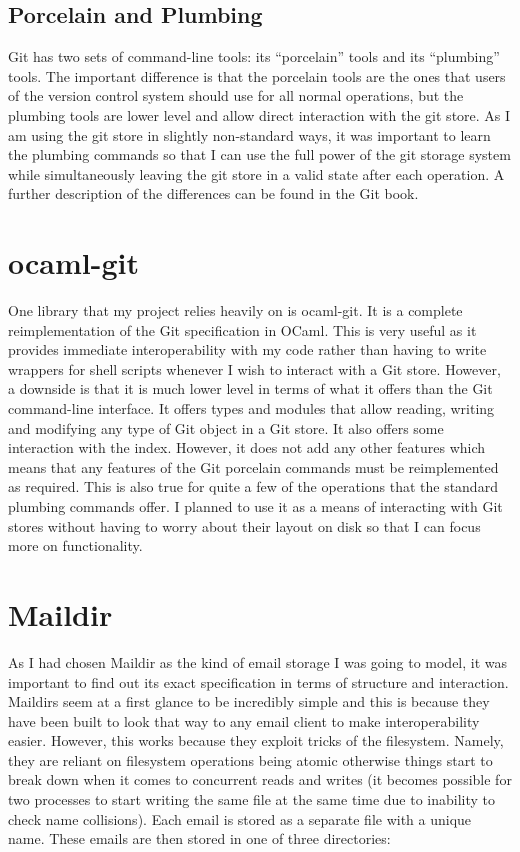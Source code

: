 \subsection{Porcelain and Plumbing}

Git has two sets of command-line tools: its ``porcelain'' tools and its ``plumbing'' tools. The important difference is that the porcelain tools are the ones that users of the version control system should use for all normal operations, but the plumbing tools are lower level and allow direct interaction with the git store. As I am using the git store in slightly non-standard ways, it was important to learn the plumbing commands so that I can use the full power of the git storage system while simultaneously leaving the git store in a valid state after each operation. A further description of the differences can be found in the Git book\cite{chacon2014git}.

\section{ocaml-git}

One library that my project relies heavily on is ocaml-git\cite{code_ocaml-git}. It is a complete reimplementation of the Git specification in OCaml. This is very useful as it provides immediate interoperability with my code rather than having to write wrappers for shell scripts whenever I wish to interact with a Git store. However,  a downside is that it is much lower level in terms of what it offers than the Git command-line interface. It offers types and modules that allow reading, writing and modifying any type of Git object in a Git store. It also offers some interaction with the index. However, it does not add any other features which means that any features of the Git porcelain commands must be reimplemented as required. This is also true for quite a few of the operations that the standard plumbing commands offer. I planned to use it as a means of interacting with Git stores without having to worry about their layout on disk so that I can focus more on functionality.

\section{Maildir}

As I had chosen Maildir as the kind of email storage I was going to model, it was important to find out its exact specification in terms of structure and interaction. Maildirs seem at a first glance to be incredibly simple and this is because they have been built to look that way to any email client to make interoperability easier. However, this works because they exploit tricks of the filesystem. Namely, they are reliant on filesystem operations being atomic otherwise things start to break down when it comes to concurrent reads and writes (it becomes possible for two processes to start writing the same file at the same time due to inability to check name collisions).
Each email is stored as a separate file with a unique name. These emails are then stored in one of three directories:

